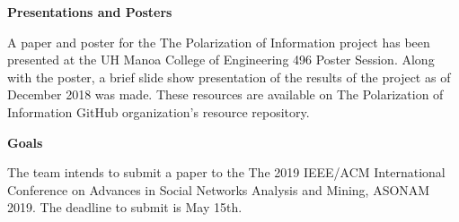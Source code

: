 \documentclass{article}
\begin{document}
\vspace{0.5cm}

\par \noindent \textbf{Presentations and Posters}

\par A paper and poster for the The Polarization of Information project has been presented at the UH Manoa College of Engineering 496 Poster Session. Along with the poster, a brief slide show presentation of the results of the project as of December 2018 was made. These resources are available on The Polarization of Information GitHub organization's resource repository. 

\vspace{0.5cm}

\par \noindent \textbf{Goals}

\par The team intends to submit a paper to the The 2019 IEEE/ACM International Conference on Advances in Social Networks Analysis and Mining, ASONAM 2019. The deadline to submit is May 15th. 
\end{document}
